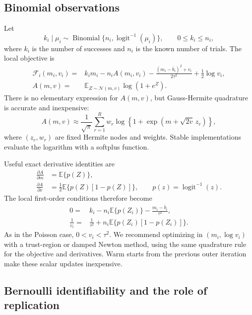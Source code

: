 \documentclass[11pt]{article}
\newcommand{\E}{\mathbb{E}}
\newcommand{\N}{\mathcal{N}}
\newcommand{\Bin}{\operatorname{Binomial}}
\newcommand{\sigmoid}{\operatorname{logit}^{-1}}
\begin{document}
\subsection{Binomial observations}

Let
\begin{equation}
 k_i\mid\mu_i\sim\Bin\{n_i,\sigmoid(\mu_i)\},
 \qquad 0\leq k_i\leq n_i,
 \label{eq:binomial-model}
\end{equation}
where $k_i$ is the number of successes and $n_i$ is the known number of
trials. The local objective is
\begin{align}
 \mathcal{F}_i(m_i,v_i)
 ={}& k_i m_i-n_i A(m_i,v_i)
 -\frac{(m_i-\bar b_i)^2+v_i}{2\tau^2}
 +\frac{1}{2}\log v_i,
 \label{eq:binomial-vga}\\
 A(m,v)={}&\E_{Z\sim\N(m,v)}\log(1+e^Z).
 \nonumber
\end{align}
There is no elementary expression for $A(m,v)$, but Gauss-Hermite quadrature
is accurate and inexpensive:
\begin{equation}
 A(m,v)\approx \frac{1}{\sqrt{\pi}}
 \sum_{r=1}^R w_r\log\left\{1+
 \exp\left(m+\sqrt{2v}\,z_r\right)\right\},
 \label{eq:gh}
\end{equation}
where $(z_r,w_r)$ are fixed Hermite nodes and weights. Stable implementations
evaluate the logarithm with a softplus function.

Useful exact derivative identities are
\begin{align}
 \frac{\partial A}{\partial m}
 &=\E\{p(Z)\}, \\
 \frac{\partial A}{\partial v}
 &=\frac{1}{2}\E\{p(Z)[1-p(Z)]\},
 \qquad p(z)=\sigmoid(z).
\end{align}
The local first-order conditions therefore become
\begin{align}
 0={}&k_i-n_i\E\{p(Z_i)\}
      -\frac{m_i-\bar b_i}{\tau^2},
 \label{eq:bin-score-m}\\
 \frac{1}{v_i}={}&\frac{1}{\tau^2}
 +n_i\E\{p(Z_i)[1-p(Z_i)]\}.
 \label{eq:bin-score-v}
\end{align}
As in the Poisson case, $0<v_i<\tau^2$. We recommend optimizing in
$(m_i,\log v_i)$ with a trust-region or damped Newton method, using the same
quadrature rule for the objective and derivatives. Warm starts from the
previous outer iteration make these scalar updates inexpensive.

\subsection{Bernoulli identifiability and the role of replication}
\end{document}
